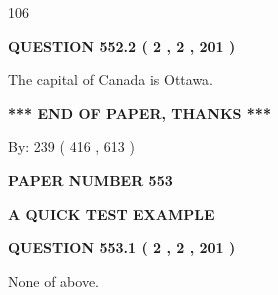 \documentclass[12pt]{article}
\begin{document}
106
 
 
  
\vspace{0.2in}
  
{\textbf{\Large{QUESTION
552.2 
 ( 2 , 2 , 201 )
}}}
  
  
 
 
\noindent{}
 
 
The capital of Canada is Ottawa.
 
 
 
 
   
   
 \vspace{0.2in}
 
   
   
   
   
\vspace{1.0in} 
{\textbf{\large{ *** END OF PAPER, THANKS *** }}} 
   
   
\hspace{1.0in} By: 
 239 ( 416 ,  613 )
   
   
   
   
\newpage 
\setcounter{page}{ 
   553001 } 
   
   
   
   
 {\textbf{ \Large{ PAPER NUMBER  553  }}}
   
   
\vspace{0.2in}
   
   
   
   
   
   
 \vspace{0.2in}
{\LARGE {\textbf{ A QUICK TEST EXAMPLE}}}
   
   
  
\vspace{0.2in}
  
{\textbf{\Large{QUESTION
553.1 
 ( 2 , 2 , 201 )
}}}
  
  
 
 
\noindent{}
 
 
 None of above.
 
 
 
 
  
\vspace{0.2in}
  
\end{document}
